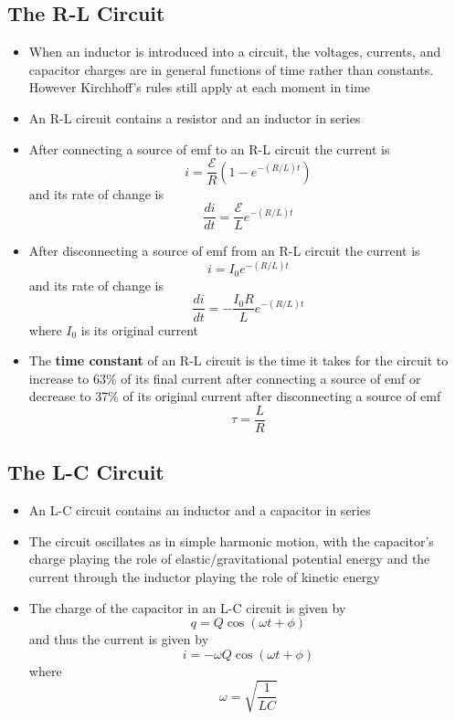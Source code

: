 \documentclass{article}
\begin{document}
\subsection{The R-L Circuit}

\begin{itemize}
  \item When an inductor is introduced into a circuit, the voltages, currents, and capacitor charges are in general functions of time rather than constants. However Kirchhoff's rules still apply at each moment in time

  \item An R-L circuit contains a resistor and an inductor in series

  \item After connecting a source of emf to an R-L circuit the current is \[i = \frac{\mathcal{E}}{R} (1 - e^{-(R / L) t})\] and its rate of change is \[\frac{di}{dt} = \frac{\mathcal{E}}{L} e^{-(R / L) t}\]

  \item After disconnecting a source of emf from an R-L circuit the current is \[i = I_0 e^{-(R / L) t}\] and its rate of change is \[\frac{di}{dt} = -\frac{I_0 R}{L} e^{-(R / L) t}\] where $I_0$ is its original current

  \item The \textbf{time constant} of an R-L circuit is the time it takes for the circuit to increase to 63\% of its final current after connecting a source of emf or decrease to 37\% of its original current after disconnecting a source of emf \[\tau = \frac{L}{R}\]
\end{itemize}

\subsection{The L-C Circuit}

\begin{itemize}
  \item An L-C circuit contains an inductor and a capacitor in series

  \item The circuit oscillates as in simple harmonic motion, with the capacitor's charge playing the role of elastic/gravitational potential energy and the current through the inductor playing the role of kinetic energy

  \item The charge of the capacitor in an L-C circuit is given by \[q = Q \cos ( \omega t + \phi )\] and thus the current is given by \[i = -\omega Q \cos ( \omega t + \phi )\] where \[\omega = \sqrt{\frac{1}{L C}}\]
\end{itemize}
\end{document}
